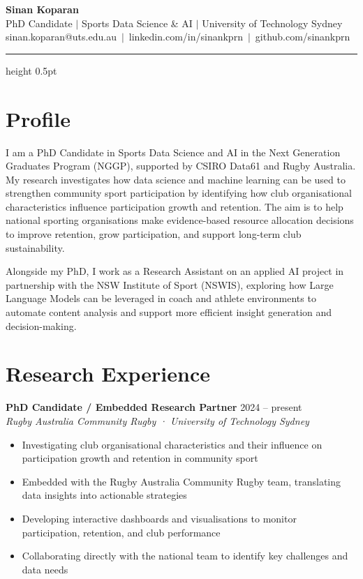 \documentclass[11pt, a4paper]{article}
\begin{document}
\begin{center}
{\LARGE \textbf{Sinan Koparan}}\\[0.3em]
{\normalsize PhD Candidate $|$ Sports Data Science \& AI $|$ University of Technology Sydney}\\[0.2em]
{\small sinan.koparan@uts.edu.au $\,|\,$ linkedin.com/in/sinankprn $\,|\,$ github.com/sinankprn}
\end{center}

\vspace{0.2em}
{\color{rulecolor}\hrule height 0.5pt}
\vspace{0.5em}

\section*{Profile}

I am a PhD Candidate in Sports Data Science and AI in the Next Generation Graduates Program (NGGP), supported by CSIRO Data61 and Rugby Australia. My research investigates how data science and machine learning can be used to strengthen community sport participation by identifying how club organisational characteristics influence participation growth and retention. The aim is to help national sporting organisations make evidence-based resource allocation decisions to improve retention, grow participation, and support long-term club sustainability.

Alongside my PhD, I work as a Research Assistant on an applied AI project in partnership with the NSW Institute of Sport (NSWIS), exploring how Large Language Models can be leveraged in coach and athlete environments to automate content analysis and support more efficient insight generation and decision-making.

\section*{Research Experience}

\textbf{PhD Candidate / Embedded Research Partner} \hfill 2024 – present\\
\textit{Rugby Australia Community Rugby · University of Technology Sydney}
\begin{itemize}
  \item Investigating club organisational characteristics and their influence on participation growth and retention in community sport
  \item Embedded with the Rugby Australia Community Rugby team, translating data insights into actionable strategies
  \item Developing interactive dashboards and visualisations to monitor participation, retention, and club performance
  \item Collaborating directly with the national team to identify key challenges and data needs
\end{itemize}
\end{document}
